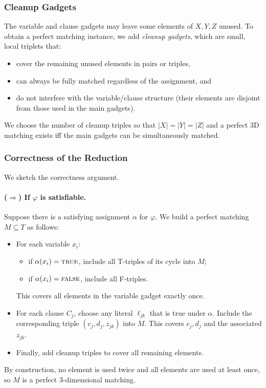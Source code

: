 \documentclass[9pt]{extarticle}
\begin{document}
\subsubsection*{Cleanup Gadgets}

The variable and clause gadgets may leave some elements of \(X,Y,Z\) unused.
To obtain a perfect matching instance, we add \emph{cleanup gadgets}, which are
small, local triplets that:
\begin{itemize}
    \item cover the remaining unused elements in pairs or triples,
    \item can always be fully matched regardless of the assignment, and
    \item do not interfere with the variable/clause structure
          (their elements are disjoint from those used in the main gadgets).
\end{itemize}
We choose the number of cleanup triples so that
\(|X| = |Y| = |Z|\) and a perfect 3D matching exists iff the main gadgets can
be simultaneously matched.

\subsubsection*{Correctness of the Reduction}

We sketch the correctness argument.

\paragraph{($\Rightarrow$) If \(\varphi\) is satisfiable.}

Suppose there is a satisfying assignment \(\alpha\) for \(\varphi\).  We build a
perfect matching \(M \subseteq T\) as follows:
\begin{itemize}
    \item For each variable \(x_i\):
        \begin{itemize}
            \item if \(\alpha(x_i)=\textsc{true}\), include all T-triples of its
                  cycle into \(M\);
            \item if \(\alpha(x_i)=\textsc{false}\), include all F-triples.
        \end{itemize}
        This covers all elements in the variable gadget exactly once.
    \item For each clause \(C_j\), choose any literal \(\ell_{jk}\) that is
          true under \(\alpha\).  Include the corresponding triple
          \((c_j,d_j,z_{jk})\) into \(M\).  This covers \(c_j,d_j\) and the
          associated \(z_{jk}\).
    \item Finally, add cleanup triples to cover all remaining elements.
\end{itemize}
By construction, no element is used twice and all elements are used at least
once, so \(M\) is a perfect 3-dimensional matching.
\end{document}
